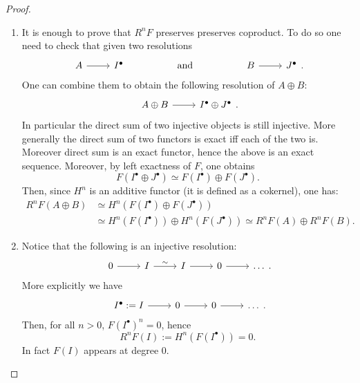 \documentclass[../Main]{subfiles}
\begin{document}
\begin{proof}\leavevmode\vspace{-.2\baselineskip}
\begin{enumerate}
	\item It is enough to prove that $R^nF$ preserves preserves coproduct.
		To do so one need to check that given two resolutions
		\begin{equation}
		\begin{tikzcd}
				A \arrow[r, "", rightarrow] &
				I^\bullet &
				\qquad \text{ and } \qquad &
				B \arrow[r, "", rightarrow] &
				J^\bullet 
		\end{tikzcd}
		.\end{equation} 
		One can combine them to obtain the following resolution of $A \oplus B$:
		\begin{equation}
		\begin{tikzcd}
			A \oplus B \arrow[r, "", rightarrow] &
			I^\bullet \oplus J^\bullet
		\end{tikzcd}
		.\end{equation} 
		In particular the direct sum of two injective objects is still injective.
		More generally the direct sum of two functors is exact iff each of the two is.
		Moreover direct sum is an exact functor, hence the above is an exact sequence.
		Moreover, by left exactness of $F$, one obtains
		\begin{equation}
			F(I^\bullet \oplus J^\bullet) \simeq
			F(I^\bullet) \oplus F(J^\bullet)
		.\end{equation} 
		Then, since $H^n$ is an additive functor (it is defined as a cokernel),
		one has:
		\begin{align}
			R^{n}F \left( A \oplus B\right) &\simeq
		H^n(F(I^\bullet) \oplus F(J^\bullet)) \\
					&\simeq
		H^n(F(I^\bullet)) \oplus H^n(F(J^\bullet)) \simeq
		R^{n}F \left( A \right) \oplus R^{n}F \left( B \right)
		.\end{align} 

	\item Notice that the following is an injective resolution:
		\begin{equation}
		\begin{tikzcd}
			0 \arrow[r, "", rightarrow] &
			I \arrow[r, "\sim", rightarrow] &
			I \arrow[r, "", rightarrow] &
			0 \arrow[r, "", rightarrow] &
			\ldots
		\end{tikzcd}
		.\end{equation} 
		More explicitly we have
		\begin{equation}
		\begin{tikzcd}
			I^\bullet := I \arrow[r, "", rightarrow] &
			0 \arrow[r, "", rightarrow] &
			0 \arrow[r, "", rightarrow] &
			\ldots
		\end{tikzcd}
		.\end{equation} 
		Then, for all $n > 0$, $F(I^\bullet)^n = 0$, hence
		\begin{equation}
			R^{n}F \left( I \right) :=
			H^{n} \left( F(I^\bullet)\right) = 0
		.\end{equation} 
		In fact $F(I)$ appears at degree $0$.


\end{enumerate}
\end{proof}
\end{document}
